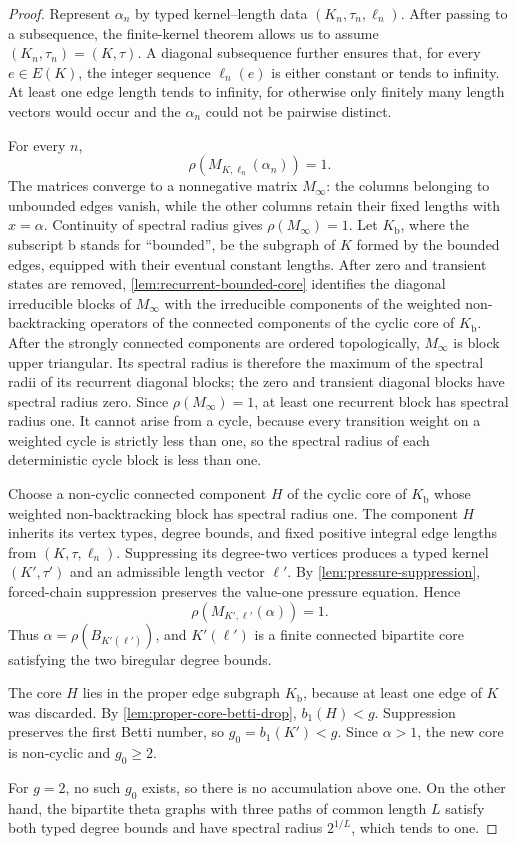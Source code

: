 \documentclass[11pt]{amsart}
\theoremstyle{plain}
\theoremstyle{definition}
\theoremstyle{remark}
\begin{document}
\begin{proof}
Represent \(\alpha_n\) by typed kernel--length data
\((K_n,\tau_n,\ell_n)\).  After passing to a subsequence, the finite-kernel
theorem allows us to assume \((K_n,\tau_n)=(K,\tau)\).  A diagonal
subsequence further ensures that,
for every \(e\in E(K)\), the integer sequence \(\ell_n(e)\) is either
constant or tends to infinity.  At least one edge length tends to infinity,
for otherwise only finitely many length vectors would occur and the
\(\alpha_n\) could not be pairwise distinct.

For every \(n\),
\[
  \rho(M_{K,\ell_n}(\alpha_n))=1.
\]
The matrices converge to a nonnegative matrix \(M_\infty\): the columns
belonging to unbounded edges vanish, while the other columns retain their
fixed lengths with \(x=\alpha\).  Continuity of spectral radius gives
\(\rho(M_\infty)=1\).  Let \(K_{\mathrm b}\), where the subscript
\({\mathrm b}\) stands for ``bounded'', be the subgraph of \(K\) formed by
the bounded edges, equipped with their eventual constant lengths.  After zero
and transient states are removed,
\cref{lem:recurrent-bounded-core} identifies the diagonal irreducible blocks
of \(M_\infty\) with the irreducible components of the weighted
non-backtracking operators of the connected components of the cyclic core of
\(K_{\mathrm b}\).  After the strongly connected components are ordered
topologically, \(M_\infty\) is block upper triangular.  Its spectral radius
is therefore the maximum of the spectral radii of its recurrent diagonal
blocks; the zero and transient diagonal blocks have spectral radius zero.
Since \(\rho(M_\infty)=1\), at least one recurrent block has spectral radius
one.  It cannot arise from a cycle, because every transition weight on a
weighted cycle is strictly less than one, so the spectral radius of each
deterministic cycle block is less than one.

Choose a non-cyclic connected component \(H\) of the cyclic core of
\(K_{\mathrm b}\) whose weighted non-backtracking block has spectral radius
one.  The component \(H\) inherits its vertex types, degree bounds, and fixed
positive integral edge lengths from \((K,\tau,\ell_n)\).  Suppressing its
degree-two vertices produces a typed kernel \((K',\tau')\) and an admissible
length vector \(\ell'\).  By \cref{lem:pressure-suppression}, forced-chain
suppression preserves the value-one pressure equation.  Hence
\[
  \rho(M_{K',\ell'}(\alpha))=1.
\]
Thus \(\alpha=\rho(B_{K'(\ell')})\), and \(K'(\ell')\) is a finite connected
bipartite core satisfying the two biregular degree bounds.

The core \(H\) lies in the proper edge subgraph \(K_{\mathrm b}\), because at
least one edge of \(K\) was discarded.  By
\cref{lem:proper-core-betti-drop}, \(b_1(H)<g\).  Suppression preserves the
first Betti number, so \(g_0=b_1(K')<g\).  Since
\(\alpha>1\), the new core is non-cyclic and \(g_0\geq2\).

For \(g=2\), no such \(g_0\) exists, so there is no accumulation above one.
On the other hand, the bipartite theta graphs with three paths of common
length \(L\) satisfy both typed degree bounds and have spectral radius
\(2^{1/L}\), which tends to one.
\end{proof}
\end{document}
